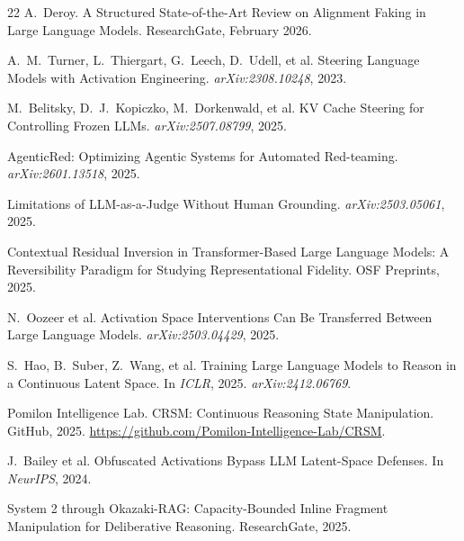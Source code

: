 \documentclass{article}
\begin{document}
\begin{thebibliography}{22}
A.~Deroy.
\newblock A Structured State-of-the-Art Review on Alignment Faking in Large Language Models.
\newblock ResearchGate, February 2026.

A.~M.~Turner, L.~Thiergart, G.~Leech, D.~Udell, et al.
\newblock Steering Language Models with Activation Engineering.
\newblock \emph{arXiv:2308.10248}, 2023.

M.~Belitsky, D.~J.~Kopiczko, M.~Dorkenwald, et al.
\newblock KV Cache Steering for Controlling Frozen LLMs.
\newblock \emph{arXiv:2507.08799}, 2025.

AgenticRed: Optimizing Agentic Systems for Automated Red-teaming.
\newblock \emph{arXiv:2601.13518}, 2025.

Limitations of LLM-as-a-Judge Without Human Grounding.
\newblock \emph{arXiv:2503.05061}, 2025.

Contextual Residual Inversion in Transformer-Based Large Language Models: A Reversibility Paradigm for Studying Representational Fidelity.
\newblock OSF Preprints, 2025.

N.~Oozeer et al.
\newblock Activation Space Interventions Can Be Transferred Between Large Language Models.
\newblock \emph{arXiv:2503.04429}, 2025.

S.~Hao, B.~Suber, Z.~Wang, et al.
\newblock Training Large Language Models to Reason in a Continuous Latent Space.
\newblock In \emph{ICLR}, 2025. \emph{arXiv:2412.06769}.

Pomilon Intelligence Lab.
\newblock CRSM: Continuous Reasoning State Manipulation.
\newblock GitHub, 2025. \url{https://github.com/Pomilon-Intelligence-Lab/CRSM}.

J.~Bailey et al.
\newblock Obfuscated Activations Bypass LLM Latent-Space Defenses.
\newblock In \emph{NeurIPS}, 2024.

System 2 through Okazaki-RAG: Capacity-Bounded Inline Fragment Manipulation for Deliberative Reasoning.
\newblock ResearchGate, 2025.

\end{thebibliography}
\end{document}
